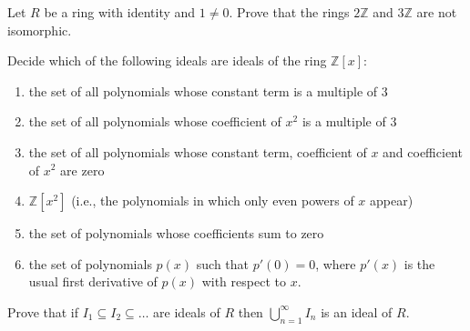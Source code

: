 \documentclass[12pt,letterpaper]{hmcpset}
\newcommand{\Zz}{\mathbb{Z}}
\begin{document}

\begin{problem}[7.3.1]
	Let $R$ be a ring with identity and $1 \ne 0$. Prove that the rings $2\Zz$ and $3\Zz$ are not isomorphic.
\end{problem}

\begin{solution}
\vfill
\end{solution}
\newpage

\begin{problem}[7.3.10]
	Decide which of the following ideals are ideals of the ring $\Zz[x]$:
	\begin{enumerate}
	    \item
	        the set of all polynomials
	        whose constant term is a
	        multiple of $3$
	    \item
	        the set of all polynomials
	        whose coefficient of
	        $x^2$ is a multiple of $3$
	    \item
	        the set of all polynomials
	        whose constant term, coefficient
	        of $x$ and coefficient of $x^2$
	        are zero
	    \item
	        $\Zz[x^2]$ (i.e., the polynomials
	        in which only even powers of $x$
	        appear)
	    \item
	        the set of polynomials whose
	        coefficients sum to zero
	    \item
	        the set of polynomials $p(x)$
	        such that $p'(0) = 0$, where
	        $p'(x)$ is the usual
	        first derivative of $p(x)$
	        with respect to $x$.
	\end{enumerate}
\end{problem}

\begin{solution}
\vfill
\end{solution}
\newpage

\begin{problem}[7.3.19]
	Prove that if $I_1 \subseteq I_2 \subseteq \dots $ are ideals of $R$ then $\bigcup_{n=1}^\infty I_n$ is an ideal of $R$.
\end{problem}

\begin{solution}
\vfill
\end{solution}
\newpage
\end{document}
